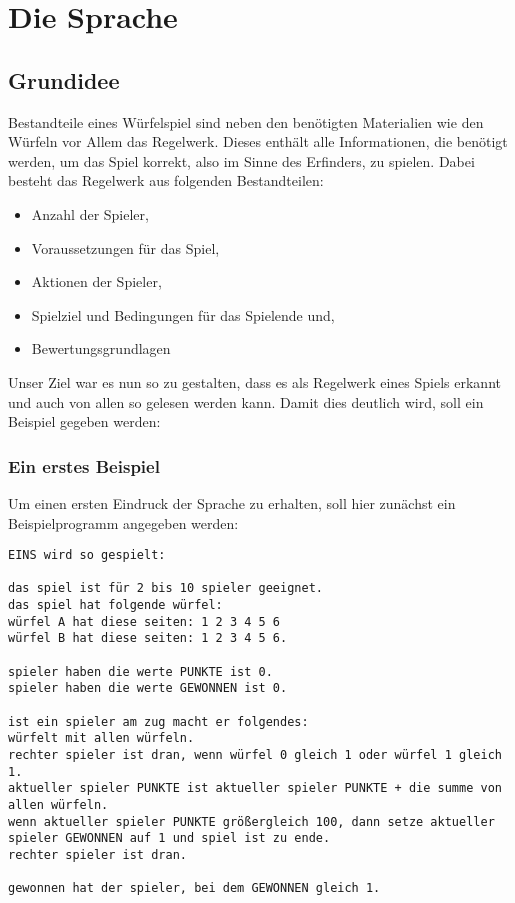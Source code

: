 
\chapter{Die Sprache} %
\label{cha:die_sprache}
	\section{Grundidee}
	\label{sec:grundidee}
		Bestandteile eines Würfelspiel sind neben den benötigten Materialien wie den Würfeln vor Allem das Regelwerk. Dieses enthält alle Informationen, die benötigt werden, um das Spiel korrekt, also im Sinne des Erfinders, zu spielen. Dabei besteht das Regelwerk aus folgenden Bestandteilen:
		\begin{itemize}
			\item Anzahl der Spieler,
			\item Voraussetzungen für das Spiel,
			\item Aktionen der Spieler,
			\item Spielziel und Bedingungen für das Spielende und,
			\item Bewertungsgrundlagen
		\end{itemize}
		Unser Ziel war es nun \dg so zu gestalten, dass es als Regelwerk eines Spiels erkannt und auch von allen so gelesen werden kann. Damit dies deutlich wird, soll ein Beispiel gegeben werden:
		\subsection{Ein erstes Beispiel}
		\label{sub:ein_erstes_beispiel}
			Um einen ersten Eindruck der Sprache zu erhalten, soll hier zunächst ein Beispielprogramm angegeben werden:\\
\begin{lstlisting}
EINS wird so gespielt:

das spiel ist für 2 bis 10 spieler geeignet.
das spiel hat folgende würfel:
würfel A hat diese seiten: 1 2 3 4 5 6
würfel B hat diese seiten: 1 2 3 4 5 6.

spieler haben die werte PUNKTE ist 0.
spieler haben die werte GEWONNEN ist 0.

ist ein spieler am zug macht er folgendes:
würfelt mit allen würfeln.
rechter spieler ist dran, wenn würfel 0 gleich 1 oder würfel 1 gleich 1.
aktueller spieler PUNKTE ist aktueller spieler PUNKTE + die summe von allen würfeln.
wenn aktueller spieler PUNKTE größergleich 100, dann setze aktueller spieler GEWONNEN auf 1 und spiel ist zu ende.
rechter spieler ist dran.

gewonnen hat der spieler, bei dem GEWONNEN gleich 1.
\end{lstlisting}

